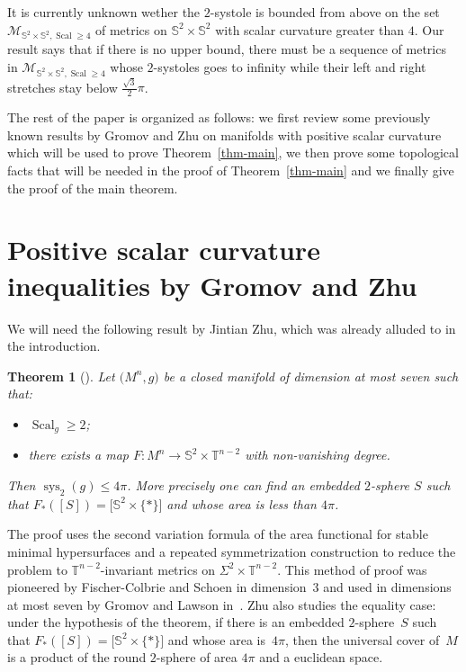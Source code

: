 \documentclass[pdftex]{sigma}
\numberwithin{equation}{section}
\newtheorem{thm}{Theorem}[section]
\DeclareMathOperator{\scal}{Scal}
\DeclareMathOperator{\sys}{sys}
\begin{document}
It is currently unknown wether the $2$-systole is
bounded from above on the set
$\mathcal{M}_{\mathbb{S}^2\times\mathbb{S}^2,\scal\geq 4}$ of metrics on
$\mathbb{S}^2\times\mathbb{S}^2$ with scalar curvature greater than
$4$. Our result says that if there is no upper bound, there
must be a sequence of metrics in $\mathcal{M}_{\mathbb{S}^2\times\mathbb{S}^2,\scal\geq 4}$
whose $2$-systoles goes to infinity while their left and right
stretches stay below $\tfrac{\sqrt{3}}{2}\pi$.

The rest of the paper is organized as follows: we first review some
previously known results by Gromov and Zhu on manifolds with positive scalar curvature
which will be used to prove Theorem~\ref{thm-main}, we then prove some
topological facts that will be needed in the proof of Theorem~\ref{thm-main} and we finally give the proof of the main theorem.

\section{Positive scalar curvature inequalities by Gromov and Zhu}\label{sec:results-gromov-zhu}

We will need the following result by Jintian Zhu, which was already
alluded to in the introduction.

\begin{thm}[{\cite[Theorem 1.2]{zhu2020rigidity}}]\label{thm-zhu}
 Let $\big(M^n,g\big)$ be a closed manifold of dimension at most seven such
 that:
 \begin{itemize}\itemsep=0pt
 \item $\scal_g\geq 2$;
 \item there exists a map $F\colon M^n\to\mathbb{S}^2\times\mathbb{T}^{n-2}$
 with non-vanishing degree.
 \end{itemize}
 Then $\sys_2(g)\leq 4\pi$. More precisely one can find an
 embedded $2$-sphere $S$ such that
 $F_*([S])=\big[\mathbb{S}^2\times\{\ast\}\big]$ and whose area is less than $4\pi$.
\end{thm}
The proof uses the second variation formula of the area functional for stable minimal hypersurfaces and a
repeated symmetrization construction to reduce the problem to
$\mathbb{T}^{n-2}$-invariant metrics on
$\Sigma^2\times\mathbb{T}^{n-2}$. This method of proof was pioneered
by Fischer-Colbrie and Schoen in dimension~3 and used in
dimensions at most seven by Gromov and Lawson in~\cite{gromov1983positive}. Zhu also \mbox{studies} the equality case: under
the hypothesis of the theorem, if there is an embedded $2$-sphere~$S$
such that $F_* ([S]) = \big[\mathbb{S}^2 \times \{*\}\big]$ and whose area is~$4\pi$, then the universal cover of~$M$ is a product of the round $2$-sphere of area $4\pi$ and a euclidean space.
\end{document}
